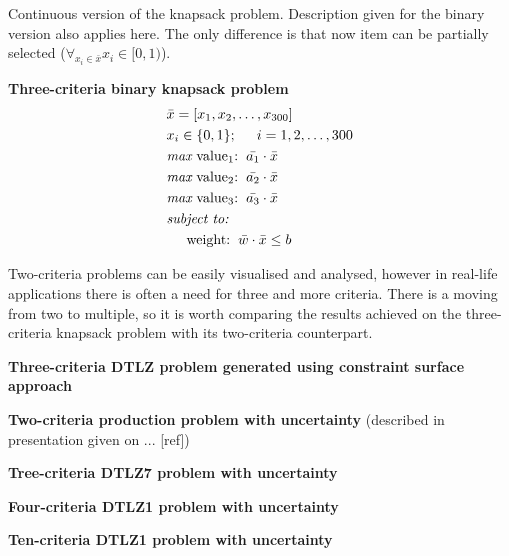 \begin{description}
    Continuous version of the knapsack problem. Description given for the
    binary version also applies here. The only difference is that now item can
    be partially selected ($\forall_{x_i \in \bar{x}} x_i \in [0, 1)$). 

  \item{\textbf{Three-criteria binary knapsack problem}}
    \begin{align*}
      & \bar{x} = [x_1, x_2, \dots, x_{300}]  \\
      & x_i \in \{0, 1\};  \hspace{0.5cm} i = 1, 2, \dots, 300 \\
      & \textit{max}\text{ value$_1$:} \hspace{0.2cm} \bar{a_1} \cdot \bar{x} \\
      & \textit{max}\text{ value$_2$:} \hspace{0.2cm} \bar{a_2} \cdot \bar{x} \\
      & \textit{max}\text{ value$_3$:} \hspace{0.2cm} \bar{a_3} \cdot \bar{x} \\
      & \textit{subject to:} \\
      & \hspace{0.5cm} \text{weight:} \hspace{0.2cm} \bar{w} \cdot \bar{x} \leq b
    \end{align*}

    Two-criteria problems can be easily visualised and analysed, however in
    real-life applications there is often a need for three and more
    criteria. There is a moving from two to multiple, so it is worth comparing
    the results achieved on the three-criteria knapsack problem with its
    two-criteria counterpart. 

  \item{\textbf{Three-criteria DTLZ problem generated using constraint surface
    approach}}

  \item{\textbf{Two-criteria production problem with uncertainty} (described in
    presentation given on ... [ref])}

  \item{\textbf{Tree-criteria DTLZ7 problem with uncertainty}}

  \item{\textbf{Four-criteria DTLZ1 problem with uncertainty}}

  \item{\textbf{Ten-criteria DTLZ1 problem with uncertainty}}

\end{description}

